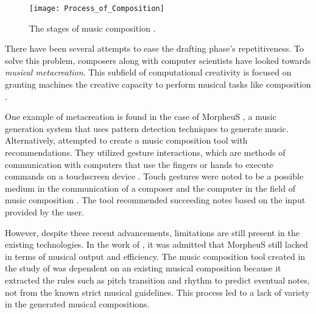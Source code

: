 \begin{figure}[H]
    \centering
	\texttt{[image: Process\_of\_Composition]}
    \caption{The stages of music composition \citep{bennett1976process}.}
    \label{fig:composing-graph}
\end{figure}


There have been several attempts to ease the drafting phase's repetitiveness. To solve this problem, composers along with computer scientists have looked towards \textit{musical metacreation}. This subfield of computational creativity is focused on granting machines the creative capacity to perform musical tasks like composition \citep{pasquier2017an}.

One example of metacreation is found in the case of MorpheuS \citep{herremans2016morpheus}, a music generation system that uses pattern detection techniques to generate music. Alternatively, \citet{kikuchi2016music} attempted to create a music composition tool with recommendations. They utilized gesture interactions, which are methods of communication with computers that use the fingers or hands to execute commands on a touchscreen device \citep{kammer2010towards}. Touch gestures were noted to be a possible medium in the communication of a composer and the computer in the field of music composition \citep{kurtenbach1996gestures}. The tool recommended succeeding notes based on the input provided by the user. 


However, despite these recent advancements, limitations are still present in the existing technologies. In the work of \citet{herremans2016morpheus}, it was admitted that MorpheuS still lacked in terms of musical output and efficiency. The music composition tool created in the study of \citet{kikuchi2016music} was dependent on an existing musical composition because it extracted the rules such as pitch transition and rhythm to predict eventual notes, not from the known strict musical guidelines. This process led to a lack of variety in the generated musical compositions.

\begin{comment}
To solve this lack of variety there were studies that focused on generating musical structures that adhere to a specific theme. Some researchers focused on the structure of happy melodies where they discerned the emotion of happiness in the algorithm by defining explicit rules and using relations to form a generated theme phrase \citep{cao2015automatic}. It was also noted that the researchers created variance in the system by adding a factor of randomness in the pitch generation while still keeping true to the theme of happiness \citep{cao2015automatic}. This yielded computer generated music that was comparable to man-made music \citep{cao2015automatic}.
\end{comment}

